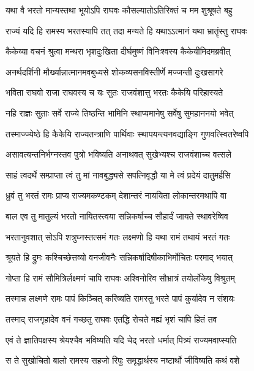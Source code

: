\twolineshloka
{यथा वै भरतो मान्यस्तथा भूयोऽपि राघवः}
{कौसल्यातोऽतिरिक्तं च मम शुश्रूषते बहु} %

\twolineshloka
{राज्यं यदि हि रामस्य भरतस्यापि तत् तदा}
{मन्यते हि यथाऽऽत्मानं यथा भ्रातॄंस्तु राघवः} %

\twolineshloka
{कैकेय्या वचनं श्रुत्वा मन्थरा भृशदुःखिता}
{दीर्घमुष्णं विनिःश्वस्य कैकेयीमिदमब्रवीत्} %

\twolineshloka
{अनर्थदर्शिनी मौर्ख्यान्नात्मानमवबुध्यसे}
{शोकव्यसनविस्तीर्णे मज्जन्ती दुःखसागरे} %

\twolineshloka
{भविता राघवो राजा राघवस्य च यः सुतः}
{राजवंशात्तु भरतः कैकेयि परिहास्यते} %

\twolineshloka
{नहि राज्ञः सुताः सर्वे राज्ये तिष्ठन्ति भामिनि}
{स्थाप्यमानेषु सर्वेषु सुमहाननयो भवेत्} %

\twolineshloka
{तस्माज्ज्येष्ठे हि कैकेयि राज्यतन्त्राणि पार्थिवाः}
{स्थापयन्त्यनवद्याङ्गि गुणवत्स्वितरेष्वपि} %

\twolineshloka
{असावत्यन्तनिर्भग्नस्तव पुत्रो भविष्यति}
{अनाथवत् सुखेभ्यश्च राजवंशाच्च वत्सले} %

\twolineshloka
{साहं त्वदर्थे सम्प्राप्ता त्वं तु मां नावबुद्ध्यसे}
{सपत्निवृद्धौ या मे त्वं प्रदेयं दातुमर्हसि} %

\twolineshloka
{ध्रुवं तु भरतं रामः प्राप्य राज्यमकण्टकम्}
{देशान्तरं नाययिता लोकान्तरमथापि वा} %

\twolineshloka
{बाल एव तु मातुल्यं भरतो नायितस्त्वया}
{सन्निकर्षाच्च सौहार्दं जायते स्थावरेष्विव} %

\twolineshloka
{भरतानुवशात् सोऽपि शत्रुघ्नस्तत्समं गतः}
{लक्ष्मणो हि यथा रामं तथायं भरतं गतः} %

\twolineshloka
{श्रूयते हि द्रुमः कश्चिच्छेत्तव्यो वनजीवनैः}
{सन्निकर्षादिषीकाभिर्मोचितः परमाद् भयात्} %

\twolineshloka
{गोप्ता हि रामं सौमित्रिर्लक्ष्मणं चापि राघवः}
{अश्विनोरिव सौभ्रात्रं तयोर्लोकेषु विश्रुतम्} %

\twolineshloka
{तस्मान्न लक्ष्मणे रामः पापं किञ्चित् करिष्यति}
{रामस्तु भरते पापं कुर्यादेव न संशयः} %

\twolineshloka
{तस्माद् राजगृहादेव वनं गच्छतु राघवः}
{एतद्धि रोचते मह्यं भृशं चापि हितं तव} %

\twolineshloka
{एवं ते ज्ञातिपक्षस्य श्रेयश्चैव भविष्यति}
{यदि चेद् भरतो धर्मात् पित्र्यं राज्यमवाप्स्यति} %

\twolineshloka
{स ते सुखोचितो बालो रामस्य सहजो रिपुः}
{समृद्धार्थस्य नष्टार्थो जीविष्यति कथं वशे} %

